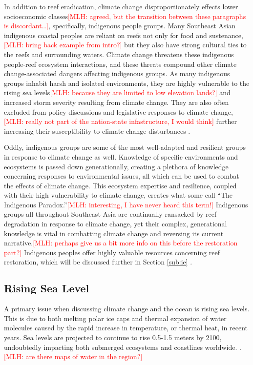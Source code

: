 \documentclass{book}\usepackage{knitr}
\newcommand{\red}[1]{\textcolor{red}{[MLH: #1]}}
\begin{document}
{In addition to reef eradication, climate change disproportionately effects lower socioeconomic classes\red{agreed, but the transition between these paragraphs is discordant\ldots}, specifically, indigenous people groups. Many Southeast Asian indigenous coastal peoples are reliant on reefs not only for food and sustenance,\red{bring back example from intro?} but they also have strong cultural ties to the reefs and surrounding waters. Climate change threatens these indigenous people-reef ecosystem interactions, and these threats compound other climate change-associated dangers affecting indigenous groups. As many indigenous groups inhabit harsh and isolated environments, they are highly vulnerable to the rising sea levels\red{because they are limited to low elevation lands?} and increased storm severity resulting from climate change. They are also often excluded from policy discussions and legislative responses to climate change,\red{really not part of the nation-state infastructure, I would think} further increasing their susceptibility to climate change disturbances \citep{13772149520190801}.

	Oddly, indigenous groups are some of the most well-adapted and resilient groups in response to climate change as well. Knowledge of specific environments and ecosystems is passed down generationally, creating a plethora of knowledge concerning responses to environmental issues, all which can be used to combat the effects of climate change. This ecosystem expertise and resilience, coupled with their high vulnerability to climate change, creates what some call ``The Indigenous Paradox.''\red{interesting, I have never heard this term!} Indigenous groups all throughout Southeast Asia are continually ransacked by reef degradation in response to climate change, yet their complex, generational knowledge is vital in combatting climate change and reversing its current narrative.\red{perhaps give us a bit more info on this before the restoration part?} Indigenous peoples offer highly valuable resources concerning reef restoration, which will be discussed further in Section \ref{sub:ie} \citep{13772149520190801}.

\subsection{Rising Sea Level}

A primary issue when discussing climate change and the ocean is rising sea levels. This is due to both melting polar ice caps and thermal expansion of water molecules caused by the rapid increase in temperature, or thermal heat, in recent years. Sea levels are projected to continue to rise 0.5-1.5 meters by 2100, undoubtedly impacting both submerged ecosystems and coastlines worldwide. \citep{coralreefalliance_2021}.\red{are there maps of water in the region?}

}
\end{document}
